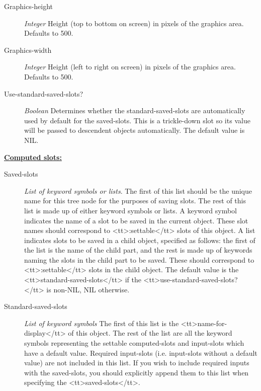 \documentclass [11pt]{book}
\begin{document}
\begin{itemize}
\begin{description}
\item [Graphics-height]
\emph{Integer} Height (top to bottom on screen) in pixels of the graphics area. Defaults to 500.


\item [Graphics-width]
\emph{Integer} Height (left to right on screen) in pixels of the graphics area. Defaults to 500.


\item [Use-standard-saved-slots?]
\emph{Boolean} Determines whether the standard-saved-slots are automatically used by default for the
saved-slots. This is a trickle-down slot so its value will be passed to descendent objects automatically.
The default value is NIL.


\end{description}






\textbf{
\underline{Computed slots:}}

\begin{description}

\item [Saved-slots]
\emph{List of keyword symbols or lists}.
The first of this list should be the unique name for this tree node for the purposes of saving slots.
The rest of this list is made up of either keyword symbols or lists. A keyword symbol indicates the
name of a slot to be saved in the current object. These slot names should correspond to <tt>:settable</tt>
slots of this object. A list indicates slots to be saved in a child object, specified as
follows: the first of the list is the name of the child part, and the rest is made up of keywords naming
the slots in the child part to be saved. These should correspond to <tt>:settable</tt>
slots in the child object.
The default value is the <tt>standard-saved-slots</tt> if the <tt>use-standard-saved-slots?</tt> is non-NIL, NIL otherwise.


\item [Standard-saved-slots]
\emph{List of keyword symbols} The first of this list is the <tt>name-for-display</tt> of this object. The rest of the list
are all the keyword symbols representing the settable computed-slots and input-slots which have a default value. Required
input-slots (i.e. input-slots without a default value) are not included in this list. If you wish to include required
inputs with the saved-slots, you should explicitly append them to this list when specifying the <tt>saved-slots</tt>.



\end{description}
\end{itemize}
\end{document}
